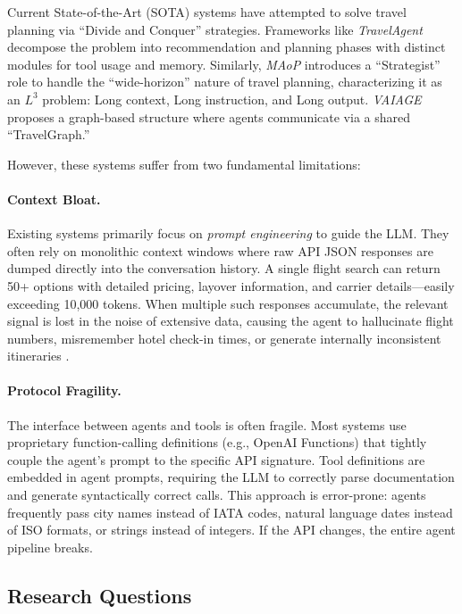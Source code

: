 \documentclass[preprint,review,12pt]{elsarticle}
\begin{document}
Current State-of-the-Art (SOTA) systems have attempted to solve travel planning via ``Divide and Conquer'' strategies. Frameworks like \textit{TravelAgent} \citep{chen2024travelagent} decompose the problem into recommendation and planning phases with distinct modules for tool usage and memory. Similarly, \textit{MAoP} \citep{yang2025planyourtravel} introduces a ``Strategist'' role to handle the ``wide-horizon'' nature of travel planning, characterizing it as an $L^3$ problem: Long context, Long instruction, and Long output. \textit{VAIAGE} \citep{ge2025vaiage} proposes a graph-based structure where agents communicate via a shared ``TravelGraph.''

However, these systems suffer from two fundamental limitations:

\paragraph{Context Bloat.} Existing systems primarily focus on \textit{prompt engineering} to guide the LLM. They often rely on monolithic context windows where raw API JSON responses are dumped directly into the conversation history. A single flight search can return 50+ options with detailed pricing, layover information, and carrier details---easily exceeding 10,000 tokens. When multiple such responses accumulate, the relevant signal is lost in the noise of extensive data, causing the agent to hallucinate flight numbers, misremember hotel check-in times, or generate internally inconsistent itineraries \citep{shen2025triptailor}.

\paragraph{Protocol Fragility.} The interface between agents and tools is often fragile. Most systems use proprietary function-calling definitions (e.g., OpenAI Functions) that tightly couple the agent's prompt to the specific API signature. Tool definitions are embedded in agent prompts, requiring the LLM to correctly parse documentation and generate syntactically correct calls. This approach is error-prone: agents frequently pass city names instead of IATA codes, natural language dates instead of ISO formats, or strings instead of integers. If the API changes, the entire agent pipeline breaks.

\subsection{Research Questions}
\end{document}
